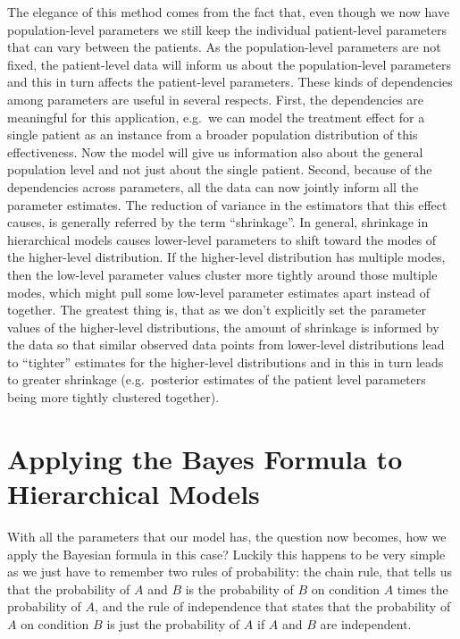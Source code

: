\documentclass[12pt,a4paper,leqno]{report}
\theoremstyle{plain}
\theoremstyle{definition}
\theoremstyle{remark}
\begin{document}
The elegance of this method comes from the fact that, even though we now have
population-level parameters we still keep the individual patient-level parameters that can vary
between the patients. As the population-level parameters are not fixed, the
patient-level data will inform us about the population-level parameters and this in turn affects the patient-level parameters. These kinds of
dependencies among parameters are useful in several respects.
First, the dependencies are meaningful for this application, e.g.\ we can
model the treatment effect for a single patient as an instance from a
broader population distribution of this effectiveness. Now the model will give us
information also about the general population level and not just about the single
patient. Second, because of the dependencies across parameters, all the data can now jointly inform all the
parameter estimates. The reduction of variance in the estimators that this
effect causes, is generally referred by the term ``shrinkage''. In general,
shrinkage in hierarchical models causes lower-level parameters to
shift toward the modes of the higher-level distribution. If the higher-level
distribution has multiple modes, then the low-level parameter values cluster
more tightly around those multiple modes, which might pull some
low-level parameter estimates apart instead of together. The greatest thing
is, that as we don't explicitly set the parameter values of the higher-level
distributions, the amount of shrinkage is informed by the data so that
similar observed data points from lower-level distributions lead to ``tighter''
estimates for the higher-level distributions and in this in turn leads to
greater shrinkage (e.g.\ posterior estimates of the patient level parameters being more
tightly clustered together).

\section{Applying the Bayes Formula to Hierarchical Models}

With all the parameters that our model has, the question now becomes, how we apply
the Bayesian formula in this case? Luckily this happens to be very simple as we just
have to remember two rules of probability: the chain rule, that
tells us that the probability of $A$ and $B$ is the probability of $B$ on condition $A$
times the probability of $A$, and the rule of independence that states that the
probability of $A$ on condition $B$ is just the probability of $A$ if $A$ and $B$ are independent.
\end{document}
